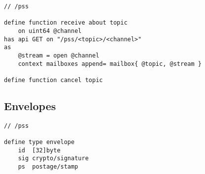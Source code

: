 \begin{definition}\label{def:receive}
\begin{lstlisting}[language=buzz1]
// /pss

define function receive about topic 
    on uint64 @channel
has api GET on "/pss/<topic>/<channel>"
as 
    @stream = open @channel
    context mailboxes append= mailbox{ @topic, @stream }
    
define function cancel topic 
\end{lstlisting}
\end{definition}

\subsection{Envelopes}

\begin{definition}[Envelope]\label{def:pss-envelope}
\begin{lstlisting}[language=buzz1]
// /pss

define type envelope
    id  [32]byte
    sig crypto/signature
    ps  postage/stamp   
    
\end{lstlisting}
\end{definition}

